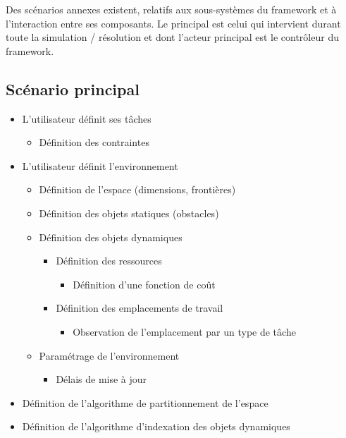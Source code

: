 Des scénarios annexes existent, relatifs aux sous-systèmes du framework et à l’interaction entre ses composants. Le principal est celui qui intervient durant toute la simulation / résolution et dont l'acteur principal est le contrôleur du framework.

\subsection{Scénario principal}

\renewcommand{\labelitemii}{$\hookrightarrow$}
\renewcommand{\labelitemiii}{$\circ$}
\begin{itemize}
\setlength{\itemsep}{5pt}
\item L'utilisateur définit ses tâches
	\begin{itemize}
	\setlength{\itemsep}{2pt}
	\item Définition des contraintes
	\end{itemize}
\item L'utilisateur définit l'environnement
	\begin{itemize}
	\setlength{\itemsep}{2pt}
	\item Définition de l'espace (dimensions, frontières)
	\item Définition des objets statiques (obstacles)
	\item Définition des objets dynamiques
		\begin{itemize}
		\item Définition des ressources
			\begin{itemize}
			\item Définition d'une fonction de coût
			\end{itemize}
		\item Définition des emplacements de travail
			\begin{itemize}
			\item Observation de l'emplacement par un type de tâche
			\end{itemize}
		\end{itemize}
	\item Paramétrage de l'environnement
		\begin{itemize}
		\item Délais de mise à jour
		\end{itemize}
	\end{itemize}
\item Définition de l'algorithme de partitionnement de l'espace
\item Définition de l'algorithme d'indexation des objets dynamiques	

\end{itemize}
